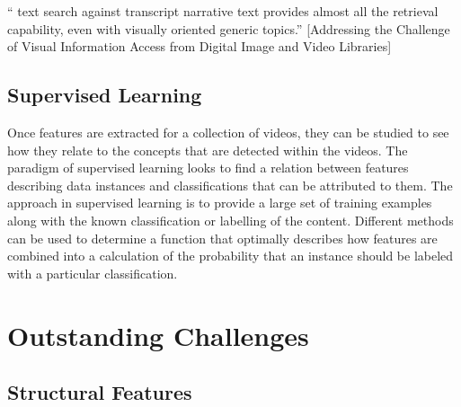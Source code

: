 `` text search against transcript narrative text provides almost all the retrieval capability, even with visually oriented generic topics.''
[Addressing the Challenge of Visual Information Access from Digital Image and Video Libraries]\cite{Christel:2005td}









\subsection{Supervised Learning}

Once features are extracted for a collection of videos, they can be studied to see how they relate to the concepts that are detected within the videos. The paradigm of supervised learning looks to find a relation between features describing data instances and classifications that can be attributed to them. The approach in supervised learning is to provide a large set of training examples along with the known classification or labelling of the content. Different methods can be used to determine a function that optimally describes how features are combined into a calculation of the probability that an instance should be labeled with a particular classification.



\section{Outstanding Challenges} %
\label{sec:outstanding_challenges}






\subsection{Structural Features}




